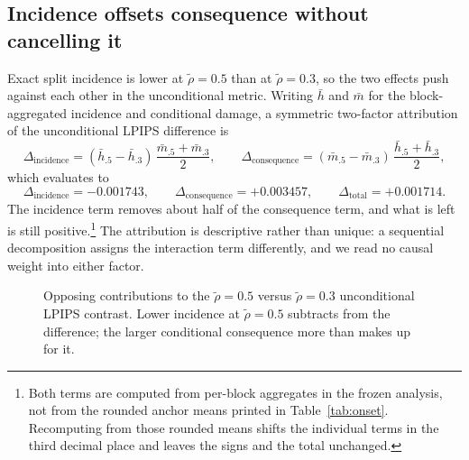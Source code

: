 \documentclass[11pt,a4paper]{article}
\theoremstyle{plain}
\theoremstyle{definition}
\theoremstyle{remark}
\newcommand{\rholabel}{\widetilde{\rho}}
\begin{document}
\subsection{Incidence offsets consequence without cancelling it}
\label{sec:attribution}

Exact split incidence is lower at $\rholabel=0.5$ than at $\rholabel=0.3$, so the two
effects push against each other in the unconditional metric. Writing $\bar h$ and
$\bar m$ for the block-aggregated incidence and conditional damage, a symmetric
two-factor attribution of the unconditional LPIPS difference is
\[
  \Delta_{\text{incidence}} = (\bar h_{.5} - \bar h_{.3})\,
    \frac{\bar m_{.5} + \bar m_{.3}}{2},
  \qquad
  \Delta_{\text{consequence}} = (\bar m_{.5} - \bar m_{.3})\,
    \frac{\bar h_{.5} + \bar h_{.3}}{2},
\]
which evaluates to
\[
  \Delta_{\text{incidence}} = -0.001743, \qquad
  \Delta_{\text{consequence}} = +0.003457, \qquad
  \Delta_{\text{total}} = +0.001714 .
\]
The incidence term removes about half of the consequence term, and what is left
is still positive.\footnote{Both terms are computed from per-block aggregates in
the frozen analysis, not from the rounded anchor means printed in
Table~\ref{tab:onset}. Recomputing from those rounded means shifts the individual
terms in the third decimal place and leaves the signs and the total unchanged.}
The attribution is descriptive rather than unique: a sequential decomposition
assigns the interaction term differently, and we read no causal weight into
either factor.

\begin{figure}[t]
\centering
{}
\caption{Opposing contributions to the $\rholabel=0.5$ versus $\rholabel=0.3$ unconditional
LPIPS contrast. Lower incidence at $\rholabel=0.5$ subtracts from the difference; the
larger conditional consequence more than makes up for it.}
\label{fig:attribution}
\end{figure}
\end{document}
